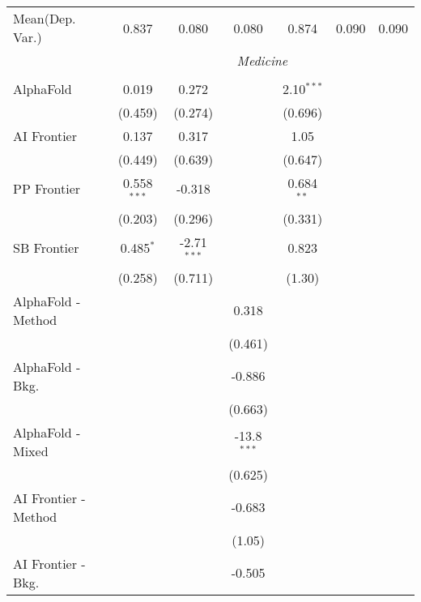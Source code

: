\begin{tabular}{lcccccc}
Mean(Dep. Var.) & 0.837 & 0.080 & 0.080 & 0.874 & 0.090 & 0.090 \\
 & \multicolumn{6}{c}{\textit{Medicine}} \\ \\
   AlphaFold            & 0.019         & 0.272         &               & 2.10$^{***}$ &        &   \\   
                        & (0.459)       & (0.274)       &               & (0.696)      &        &   \\   
   AI Frontier          & 0.137         & 0.317         &               & 1.05         &        &   \\   
                        & (0.449)       & (0.639)       &               & (0.647)      &        &   \\   
   PP Frontier          & 0.558$^{***}$ & -0.318        &               & 0.684$^{**}$ &        &   \\   
                        & (0.203)       & (0.296)       &               & (0.331)      &        &   \\   
   SB Frontier          & 0.485$^{*}$   & -2.71$^{***}$ &               & 0.823        &        &   \\   
                        & (0.258)       & (0.711)       &               & (1.30)       &        &   \\   
   AlphaFold - Method   &               &               & 0.318         &              &        &   \\   
                        &               &               & (0.461)       &              &        &   \\   
   AlphaFold - Bkg.     &               &               & -0.886        &              &        &   \\   
                        &               &               & (0.663)       &              &        &   \\   
   AlphaFold - Mixed    &               &               & -13.8$^{***}$ &              &        &   \\   
                        &               &               & (0.625)       &              &        &   \\   
   AI Frontier - Method &               &               & -0.683        &              &        &   \\   
                        &               &               & (1.05)        &              &        &   \\   
   AI Frontier - Bkg.   &               &               & -0.505        &              &        &   \\   

\end{tabular}

